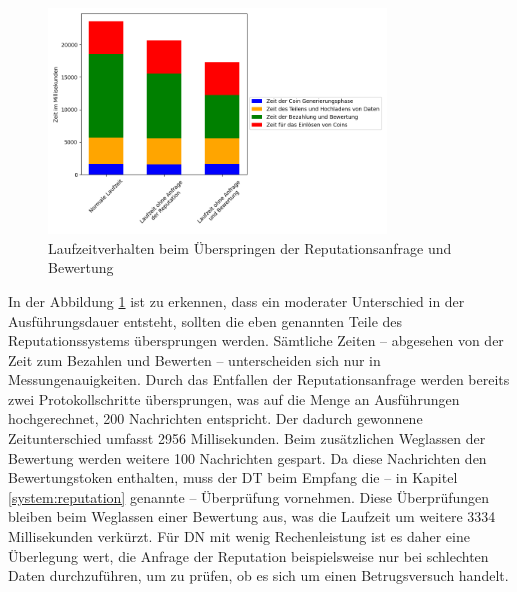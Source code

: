 \documentclass[
	fontsize=11pt,
	headings=small,
	parskip=half,           %
	bibliography=totoc,
	numbers=noenddot,       %
	open=any,               %
]{scrreprt}
\begin{document}
\begin{figure}[h]
    \caption{Laufzeitverhalten beim Überspringen der Reputationsanfrage und Bewertung}
    \label{fig:win_noRep}
    \centering
    \includegraphics[width=0.8\textwidth]{figure_win_noRep.png}
\end{figure}
In der Abbildung \ref{fig:win_noRep} ist zu erkennen, dass ein moderater Unterschied in der Ausführungsdauer entsteht, sollten die eben genannten Teile des Reputationssystems übersprungen werden. Sämtliche Zeiten -- abgesehen von der Zeit zum Bezahlen und Bewerten -- unterscheiden sich nur in Messungenauigkeiten. Durch das Entfallen der Reputationsanfrage werden bereits zwei Protokollschritte übersprungen, was auf die Menge an Ausführungen hochgerechnet, 200 Nachrichten entspricht. Der dadurch gewonnene Zeitunterschied umfasst 2956 Millisekunden. Beim zusätzlichen Weglassen der Bewertung werden weitere 100 Nachrichten gespart. Da diese Nachrichten den Bewertungstoken enthalten, muss der DT beim Empfang die -- in Kapitel \ref{system:reputation} genannte -- Überprüfung vornehmen. Diese Überprüfungen bleiben beim Weglassen einer Bewertung aus, was die Laufzeit um weitere 3334 Millisekunden verkürzt. Für DN mit wenig Rechenleistung ist es daher eine Überlegung wert, die Anfrage der Reputation beispielsweise nur bei schlechten Daten durchzuführen, um zu prüfen, ob es sich um einen Betrugsversuch handelt.
\end{document}
